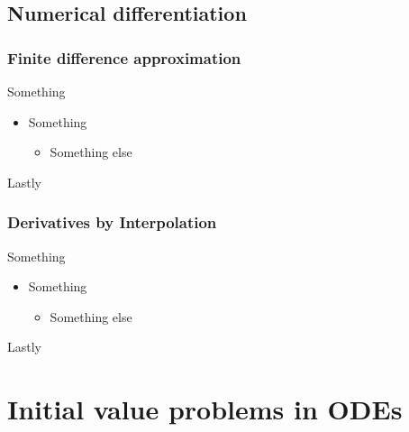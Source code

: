 \documentclass[hyperref={colorlinks=true}]{beamer}
\begin{document}
\subsection[Numerical differentiation]{Numerical differentiation}

\begin{frame}%
  \frametitle{Finite difference approximation}

  Something
  
  \vspace{0.3cm}
  
  \begin{itemize}
    \item Something
    \begin{itemize}
      \item Something else 
    \end{itemize}
  \end{itemize}
  
  Lastly

\end{frame}


\begin{frame}%
  \frametitle{Derivatives by Interpolation}

  Something
  
  \vspace{0.3cm}
  
  \begin{itemize}
    \item Something
    \begin{itemize}
      \item Something else 
    \end{itemize}
  \end{itemize}
  
  Lastly

\end{frame}

\section[Initial value problems in ODEs]{Initial value problems in ODEs}
\end{document}
